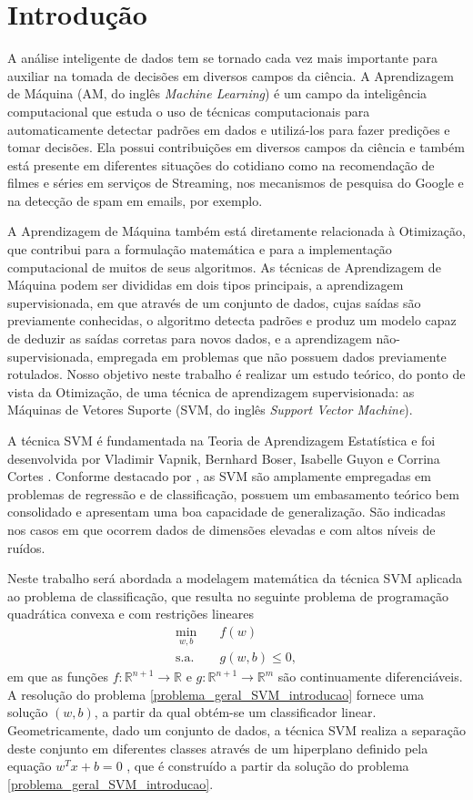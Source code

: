 \documentclass[12pt,a4paper]{scrartcl}
\def\RR{\mathds{R}}
\theoremstyle{definition}%
\begin{document}
\section{Introdução}

A análise inteligente de dados tem se tornado cada vez mais importante para auxiliar na tomada de decisões em diversos campos da ciência. A Aprendizagem de Máquina (AM, do inglês \textit{Machine Learning}) é um campo da inteligência computacional que estuda o uso de técnicas computacionais para automaticamente detectar padrões em dados e utilizá-los para fazer predições e tomar decisões. Ela possui contribuições em diversos campos da ciência e também está presente em diferentes situações do cotidiano como na recomendação de filmes e séries em serviços de Streaming, nos mecanismos de pesquisa do Google e na detecção de spam em emails, por exemplo. 

A Aprendizagem de Máquina também está diretamente relacionada à Otimização, que contribui para a formulação matemática e para a implementação computacional de muitos de seus algoritmos. As técnicas de Aprendizagem de Máquina podem ser divididas em dois tipos principais, a aprendizagem supervisionada, em que através de um conjunto de dados, cujas saídas são previamente conhecidas, o algoritmo detecta padrões e produz um modelo capaz de deduzir as saídas corretas para novos dados, e a aprendizagem não-supervisionada, empregada em problemas que não possuem dados previamente rotulados. Nosso objetivo neste trabalho é realizar um estudo teórico, do ponto de vista da Otimização, de uma técnica de aprendizagem supervisionada: as Máquinas de Vetores Suporte (SVM, do inglês \textit{Support Vector Machine}).

A técnica SVM é fundamentada na Teoria de Aprendizagem Estatística e foi desenvolvida por Vladimir Vapnik, Bernhard Boser, Isabelle Guyon e Corrina Cortes \cite{Vladimir1992,Vladimir1995}. Conforme destacado por \textcite{Evelin2017}, as SVM são amplamente empregadas em problemas de regressão e de classificação, possuem um embasamento teórico bem consolidado e apresentam uma boa capacidade de generalização. São indicadas nos casos em que ocorrem dados de dimensões elevadas e com altos níveis de ruídos. 

Neste trabalho será abordada a modelagem matemática da técnica SVM aplicada ao problema de classificação, que resulta no seguinte problema de programação quadrática convexa e com restrições lineares
\[ \label{problema_geral_SVM_introducao}
\begin{aligned}
\min_{w,b} & \quad f(w) \\
\text{s.a.} &  \quad g(w,b) \leq 0, \end{aligned}
\]
em que as funções $f:\RR^{n+1} \rightarrow \RR$ e $g:\RR^{n+1} \rightarrow \RR^{m}$ são continuamente diferenciáveis. A resolução do problema \eqref{problema_geral_SVM_introducao} fornece uma solução $(w,b)$, a partir da qual obtém-se um classificador linear. Geometricamente, dado um conjunto de dados, a técnica SVM realiza a separação deste conjunto em diferentes classes através de um hiperplano definido pela equação $w^{T}x + b = 0$ \cite{Evelin2017}, que é construído a partir da solução do problema \eqref{problema_geral_SVM_introducao}.
\end{document}

